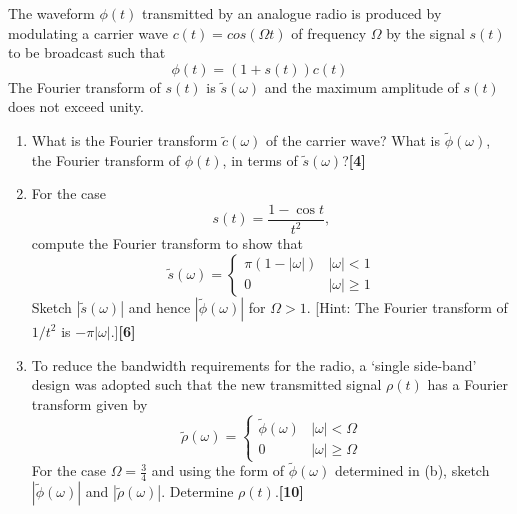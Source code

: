 \documentclass[a4paper]{article}
\begin{document}
\newpage
\begin{qns}
The waveform $\phi(t)$ transmitted by an analogue radio is produced by modulating a carrier wave $c(t) = cos(\Omega t)$ of frequency $\Omega$ by the signal $s(t)$ to be broadcast such that
$$\phi(t) = (1 +s(t))c(t)$$
The Fourier transform of $s(t)$ is $\tilde{s}(\omega)$ and the maximum amplitude of $s(t)$ does not exceed unity.
\begin{enumerate}[label=(\alph*)]
\item What is the Fourier transform $\tilde{c}(\omega)$ of the carrier wave? What is $\tilde{\phi}(\omega)$, the Fourier transform of $\phi(t)$, in terms of $\tilde{s}(\omega)$?\hfill\textbf{[4]}
\item For the case
$$s(t)=\frac{1-\cos t}{t^2},$$
compute the Fourier transform to show that
$$\tilde{s}(\omega)=
\left\{
        \begin{array}{ll}
      \pi(1-|\omega|) & |\omega|<1 \\
      0 & |\omega|\geq1
        \end{array}
    \right.$$
Sketch $|\tilde{s}(\omega)|$ and hence $|\tilde{\phi}(\omega)|$ for $\Omega>1$. [Hint: The Fourier transform of $1/t^2$ is $-\pi|\omega|$.]\hfill\textbf{[6]}
\item To reduce the bandwidth requirements for the radio, a ‘single side-band’ design was adopted such that the new transmitted signal $\rho(t)$ has a Fourier transform given by
$$\tilde{\rho}(\omega)=
\left\{
        \begin{array}{ll}
      \tilde{\phi}(\omega) & |\omega|<\Omega \\
      0 & |\omega|\geq\Omega
        \end{array}
    \right.$$
For the case $\Omega=\frac{3}{4}$ and using the form of $\tilde{\phi}(\omega)$ determined in (b), sketch $|\tilde{\phi}(\omega)|$ and $|\tilde{\rho}(\omega)|$. Determine $\rho(t)$.\hfill\textbf{[10]}
\end{enumerate}
\end{qns}
\end{document}
